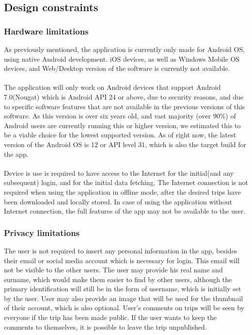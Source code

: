 \newpage
\subsection{Design constraints}
\subsubsection{Hardware limitations}
\hspace{\parindent}As previously mentioned, the application is currently only made for Android OS, using native Android development. iOS devices, as well as Windows Mobile OS devices, and Web/Desktop version of the software is currently not available.\\ \\
The application will only work on Android devices that support Android 7.0(Nougat) which is Android API 24 or above, due to security reasons, and due to specific software features that are not available in the previous versions of this software. As this version is over six years old, and vast majority (over 90\%) of Android users are currently running this or higher version, we estimated this to be a viable choice for the lowest supported version. As of right now, the latest version of the Android OS is 12 or API level 31, which is also the target build for the app.\\ \\
Device is use is required to have access to the Internet for the initial(and any subsequent) login, and for the initial data fetching. The Internet connection is not required when using the application in offline mode, after the desired trips have been downloaded and locally stored. In case of using the application without Internet connection, the full features of the app may not be available to the user.

\subsubsection{Privacy limitations}
\hspace{\parindent}The user is not required to insert any personal information in the app, besides their email or social media account which is necessary for login. This email will not be visible to the other users. The user may provide his real name and surname, which would make them easier to find by other users, although the primary identification will still be in the form of username, which is initially set by the user. User may also provide an image that will be used for the thumbnail of their account, which is also optional. User's comments on trips will be seen by everyone if the trip has been made public. If the user wants to keep the comments to themselves, it is possible to leave the trip unpublished.
